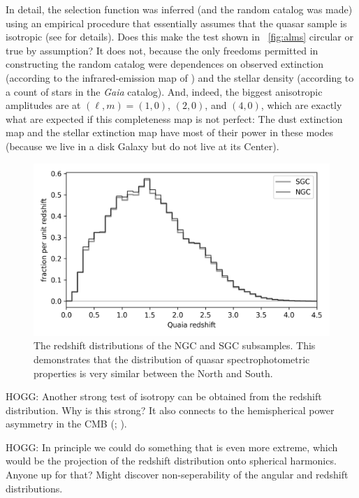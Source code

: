 \documentclass[modern]{aastex631}
\newlength{\figurewidth}
\newcommand{\figref}[1]{\figurename~\ref{#1}}
\begin{document}
In detail, the selection function was inferred (and the random catalog was made) using an empirical procedure that essentially assumes that the quasar sample is isotropic (see \citealt{ksf} for details).
Does this make the test shown in \figref{fig:alms} circular or true by assumption?
It does not, because the only freedoms permitted in constructing the random catalog were dependences on observed extinction (according to the infrared-emission map of \citealt{sfd}) and the stellar density (according to a count of stars in the \textsl{Gaia} catalog).
And, indeed, the biggest anisotropic amplitudes are at $(\ell,m)=(1,0)$, $(2,0)$, and $(4,0)$, which are exactly what are expected if this completeness map is not perfect:
The dust extinction map and the stellar extinction map have most of their power in these modes (because we live in a disk Galaxy but do not live at its Center).

\begin{figure}[t!]
  \begin{mdframed}
  \color{captiongray}
  \begin{center}
    \includegraphics[width=\figurewidth]{notebooks/zhist.png}
  \end{center}
    \caption{The redshift distributions of the NGC and SGC subsamples. This demonstrates that the distribution of quasar spectrophotometric properties is very similar between the North and South.\label{fig:zhist}}
  \end{mdframed}
\end{figure}
HOGG: Another strong test of isotropy can be obtained from the redshift distribution.
Why is this strong?
It also connects to the hemispherical power asymmetry in the CMB (\citealt{wmapanisotropy}; \citealt{planckanisotropy}).

HOGG: In principle we could do something that is even more extreme, which would be the projection of the redshift distribution onto spherical harmonics. Anyone up for that? Might discover non-seperability of the angular and redshift distributions.
\end{document}
